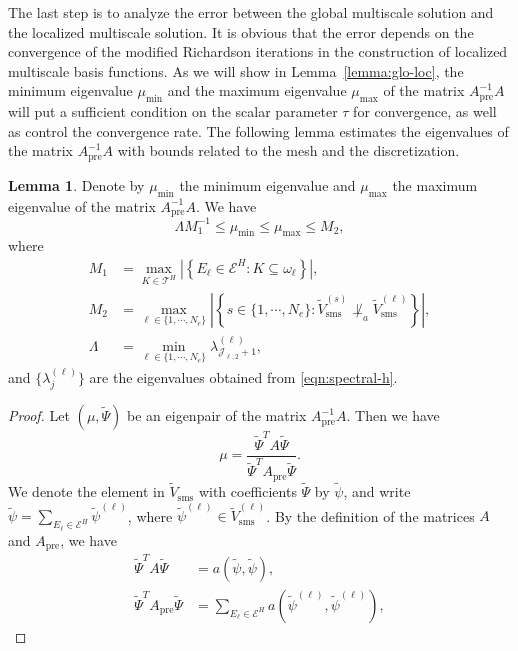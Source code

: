 \documentclass{article}[11pt]
\theoremstyle{definition}
\newtheorem{lemma}{Lemma}[section]
\begin{document}
The last step is to analyze the error between the global multiscale solution 
and the localized multiscale solution. 
It is obvious that the error depends on the convergence 
of the modified Richardson iterations in the construction of 
localized multiscale basis functions. 
As we will show in Lemma~\ref{lemma:glo-loc}, 
the minimum eigenvalue $\mu_{\text{min}}$ and 
the maximum eigenvalue $\mu_{\text{max}}$ 
of the matrix $A_{\text{pre}}^{-1} A$
will put a sufficient condition 
on the scalar parameter $\tau$ for convergence, 
as well as control the convergence rate. 
The following lemma estimates the eigenvalues of the matrix $A_{\text{pre}}^{-1}A$ 
with bounds related to the mesh and the discretization. 
\begin{lemma}\label{lemma:precond-eig}
Denote by $\mu_{\text{min}}$ the minimum eigenvalue and 
$\mu_{\text{max}}$ the maximum eigenvalue of the matrix $A_{\text{pre}}^{-1} A$. 
We have 
\begin{equation}\label{eqn:precond-eig}
\Lambda M_1^{-1} \leq \mu_{\text{min}} \leq \mu_{\text{max}} \leq M_2,
\end{equation}
where 
\[ \begin{split}
M_1 & = \max_{K \in \mathcal{T}^H} \left\vert \left\{ E_\ell \in \mathcal{E}^H: K \subseteq \omega_\ell\right\} \right\vert, \\
M_2 & = \max_{\ell \in \{1, \cdots, N_e\}} \left\vert \left\{ s \in \{1, \cdots, N_e\}: \tilde{V}_{\text{sms}}^{(s)} \not\perp_a \tilde{V}_{\text{sms}}^{(\ell)} \right\}\right\vert, \\
\Lambda &= \min_{\ell \in \{1, \cdots, N_e\}} \lambda_{\mathcal{J}_{\ell,2} +1}^{(\ell)}, 
\end{split} \]
and $\{\lambda_j^{(\ell)}\}$ are the eigenvalues obtained from \eqref{eqn:spectral-h}. 
\begin{proof}
Let $(\mu, \tilde{\Psi})$ be an eigenpair of the matrix $A_{\text{pre}}^{-1}A$. 
Then we have 
\[
\mu = \dfrac{\tilde{\Psi}^T A \tilde{\Psi}}{\tilde{\Psi}^T A_{\text{pre}} \tilde{\Psi}}.
\]
We denote the element in $\tilde V_{\text{sms}}$ with coefficients $\tilde{\Psi}$ by $\tilde \psi$, 
and write $\tilde{\psi} = \sum_{E_\ell \in \mathcal{E}^H} \tilde{\psi}^{(\ell)}$, 
where $\tilde{\psi}^{(\ell)} \in \tilde{V}_{\text{sms}}^{(\ell)}$. 
By the definition of the matrices $A$ and $A_{\text{pre}}$, we have 
\[
\begin{split}
\tilde{\Psi}^T A \tilde{\Psi} & = a(\tilde{\psi},\tilde{\psi}), \\
\tilde{\Psi}^T A_{\text{pre}} \tilde{\Psi} & = \sum_{E_\ell \in \mathcal{E}^H} a(\tilde{\psi}^{(\ell)},\tilde{\psi}^{(\ell)}), 

\end{split}\]
\end{proof}
\end{lemma}
\end{document}
